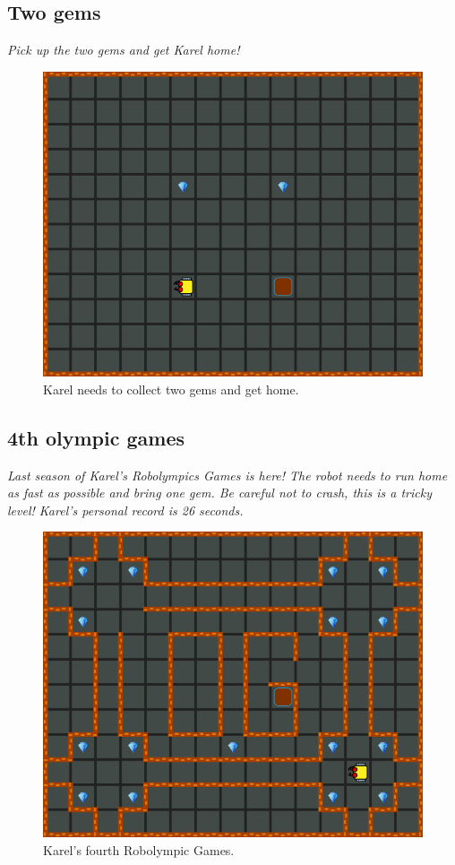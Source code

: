 \subsection{Two gems}

{\em Pick up the two gems and get Karel home!}

\begin{figure}[!ht]
\begin{center}
\includegraphics[height=0.4\textwidth]{img/a07.png}
\end{center}
\vspace{-4mm}
\caption{Karel needs to collect two gems and get home.}
\label{fig:a07}
\vspace{-1cm}
\end{figure}
\noindent

\subsection{4th olympic games}

{\em Last season of Karel's Robolympics Games is here! The 
robot needs to run home as fast as possible and bring one gem. 
Be careful not to crash, this is a tricky level! Karel's personal record is 26 seconds.}\\[-7mm]

\begin{figure}[!ht]
\begin{center}
\includegraphics[height=0.4\textwidth]{img/a08.png}
\end{center}
\vspace{-4mm}
\caption{Karel's fourth Robolympic Games.}
\label{fig:a08}
\vspace{-4mm}
\end{figure}
\noindent

